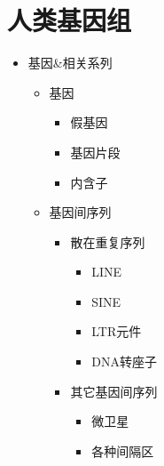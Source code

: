 \documentclass[a4paper, 12pt]{report}
\begin{document}
\section{人类基因组}
\begin{itemize}
    \item 基因\&相关系列
          \begin{itemize}
              \item 基因
                    \begin{itemize}
                        \item 假基因
                        \item 基因片段
                        \item 内含子
                    \end{itemize}
              \item 基因间序列
                    \begin{itemize}
                        \item 散在重复序列
                              \begin{itemize}
                                  \item LINE
                                  \item SINE
                                  \item LTR元件
                                  \item DNA转座子
                              \end{itemize}
                        \item 其它基因间序列
                              \begin{itemize}
                                  \item 微卫星
                                  \item 各种间隔区
                              \end{itemize}
                    \end{itemize}
          \end{itemize}
\end{itemize}
\end{document}
